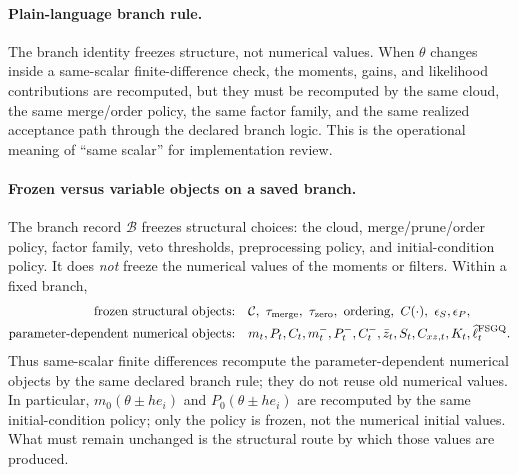 \documentclass[11pt]{article}
\numberwithin{equation}{section}
\newcommand{\ellhat}{\widehat\ell}
\begin{document}
\paragraph{Plain-language branch rule.}
The branch identity freezes structure, not numerical values.  When
\(\theta\) changes inside a same-scalar finite-difference check, the moments,
gains, and likelihood contributions are recomputed, but they must be recomputed
by the same cloud, the same merge/order policy, the same factor family, and the
same realized acceptance path through the declared branch logic.  This is the
operational meaning of ``same scalar'' for implementation review.

\paragraph{Frozen versus variable objects on a saved branch.}
The branch record \(\mathcal B\) freezes structural choices: the cloud,
merge/prune/order policy, factor family, veto thresholds, preprocessing
policy, and initial-condition policy.  It does \emph{not} freeze the numerical
values of the moments or filters.  Within a fixed branch,
\begin{equation}
\begin{aligned}
  \text{frozen structural objects:}
  &\quad \mathcal C,\ \tau_{\rm merge},\ \tau_{\rm zero},\ \text{ordering},
  \ C(\cdot),\ \epsilon_S,\epsilon_P,\\
  \text{parameter-dependent numerical objects:}
  &\quad m_t,P_t,C_t,m_t^-,P_t^-,C_t^-,\bar z_t,S_t,C_{xz,t},K_t,
  \ellhat_t^{\rm FSGQ}.
\end{aligned}
  \label{eq:p32-frozen-vs-variable}
\end{equation}
Thus same-scalar finite differences recompute the parameter-dependent numerical
objects by the same declared branch rule; they do not reuse old numerical
values.  In particular, \(m_0(\theta\pm he_i)\) and \(P_0(\theta\pm he_i)\)
are recomputed by the same initial-condition policy; only the policy is frozen,
not the numerical initial values.  What must remain unchanged is the structural
route by which those values are produced.
\end{document}
